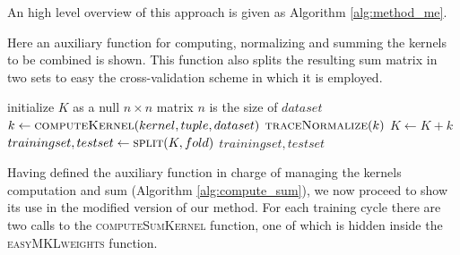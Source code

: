 An high level overview of this approach is given as Algorithm \ref{alg:method_me}.

\begin{algorithm}
    \caption{
        Here an auxiliary function for computing, normalizing and summing the
        kernels to be combined is shown.
        This function also splits the resulting sum matrix in two sets to
        easy the cross-validation scheme in which it is employed.
    }
    \label{alg:compute_sum}
    \begin{algorithmic}[1]
            \State initialize $K$ as a null $n\times n$ matrix
            \Comment $n$ is the size of $dataset$
                    \State $k \gets \Call{computeKernel}{kernel, tuple, dataset}$
                    \State $\Call{traceNormalize}{k}$
                    \State $K \gets K+k$
                \EndFor
            \EndFor
            \State $trainingset, testset \gets \Call{split}{K,fold}$
            \State \Return $trainingset, testset$
        \EndFunction
    \end{algorithmic}
\end{algorithm}

Having defined the auxiliary function in charge of managing the kernels computation
and sum (Algorithm \ref{alg:compute_sum}), we now proceed to show its use in the modified version of our method.
For each training cycle there are two calls to the \textsc{computeSumKernel}
function, one of which is hidden inside the \textsc{easyMKLweights} function.

